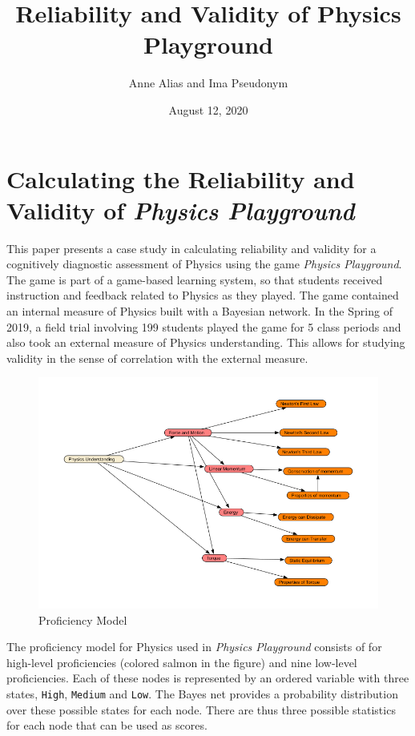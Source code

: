 \documentclass[]{article}
\title{Reliability and Validity of Physics Playground}
\author{Anne Alias and Ima Pseudonym}
\date{August 12, 2020}
\begin{document}
\maketitle

\section{\texorpdfstring{Calculating the Reliability and Validity of
\emph{Physics
Playground}}{Calculating the Reliability and Validity of Physics Playground}}\label{calculating-the-reliability-and-validity-of-physics-playground}

This paper presents a case study in calculating reliability and validity
for a cognitively diagnostic assessment of Physics using the game
\emph{Physics Playground}. The game is part of a game-based learning
system, so that students received instruction and feedback related to
Physics as they played. The game contained an internal measure of
Physics built with a Bayesian network. In the Spring of 2019, a field
trial involving 199 students played the game for 5 class periods and
also took an external measure of Physics understanding. This allows for
studying validity in the sense of correlation with the external measure.

\begin{figure}
\centering
\includegraphics{PP_OrangeNodes_6.png}
\caption{Proficiency Model}
\end{figure}

The proficiency model for Physics used in \emph{Physics Playground}
consists of for high-level proficiencies (colored salmon in the figure)
and nine low-level proficiencies. Each of these nodes is represented by
an ordered variable with three states, \texttt{High}, \texttt{Medium}
and \texttt{Low}. The Bayes net provides a probability distribution over
these possible states for each node. There are thus three possible
statistics for each node that can be used as scores.
\end{document}
